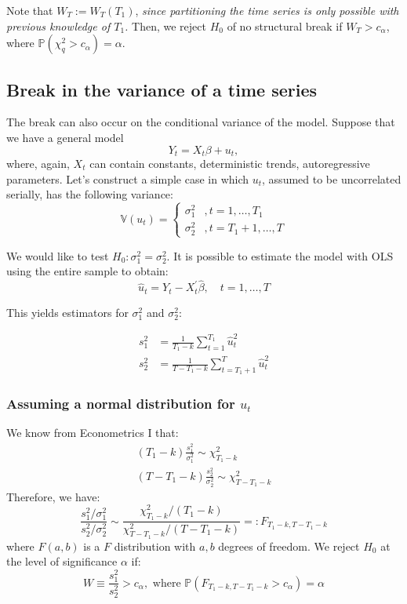 \documentclass[11pt, a4paper]{report}
\theoremstyle{plain}
\theoremstyle{plain}
\theoremstyle{remark}
\begin{document}
Note that $W_T := W_T(T_1)$, \textit{since partitioning the time series is only possible with previous knowledge of $T_1$.} Then, we reject $H_0$ of no structural break if $W_T > c_{\alpha}$, where $\mathbb{P}(\chi^2_q > c_{\alpha}) = \alpha$.

\subsection{Break in the variance of a time series}

The break can also occur on the conditional variance of the model. Suppose that we have a general model
$$ Y_t = X_t \beta + u_t,$$
where, again, $X_t$ can contain constants, deterministic trends, autoregressive parameters. Let's construct a simple case in which $u_t$, assumed to be uncorrelated serially, has the following variance:
$$\mathbb{V}\left(u_{t}\right)=\left\{\begin{array}{ll}
\sigma_{1}^{2} & , t=1, \ldots, T_{1} \\
\sigma_{2}^{2} & , t=T_{1}+1, \ldots, T
\end{array}\right.$$

We would like to test $H_0: \sigma_1^2 = \sigma_2^2$. It is possible to estimate the model with OLS using the entire sample to obtain:
$$
\widehat{u}_{t}=Y_{t}-{X}_{t}^{\prime} \widehat{\beta}, \quad t=1, \ldots, T
$$

This yields estimators for $\sigma_{1}^{2}$ and $\sigma_{2}^{2}$:

$$
\begin{aligned}
s_{1}^{2} &=\frac{1}{T_{1}-k} \sum_{t=1}^{T_{1}} \widehat{u}_{t}^{2} \\
s_{2}^{2} &=\frac{1}{T-T_{1}-k} \sum_{t=T_{1}+1}^{T} \widehat{u}_{t}^{2}
\end{aligned}
$$

\subsubsection{Assuming a normal distribution for $u_t$}

We know from Econometrics I that:
$$
\begin{array}{r}
\left(T_{1}-k\right) \frac{s_{1}^{2}}{\sigma_{1}^{2}} \sim \chi_{T_{1}-k}^{2} \\
\left(T-T_{1}-k\right) \frac{s_{2}^{2}}{\sigma_{2}^{2}} \sim \chi_{T-T_{1}-k}^{2}
\end{array}
$$
Therefore, we have:
$$
\frac{s_{1}^{2} / \sigma_{1}^{2}}{s_{2}^{2} / \sigma_{2}^{2}} \sim \frac{\chi_{T_{1}-k}^{2} /\left(T_{1}-k\right)}{\chi_{T-T_{1}-k}^{2} /\left(T-T_{1}-k\right)}=: F_{T_{1}-k, T-T_{1}-k}
$$
where $F(a, b)$ is a $F$ distribution with $a, b$ degrees of freedom. We reject $H_0$ at the level of significance $\alpha$ if:
$$
W \equiv \frac{s_{1}^{2}}{s_{2}^{2}}>c_{\alpha}, \text { where } \mathbb{P}\left(F_{T_{1}-k, T-T_{1}-k}>c_{\alpha}\right)=\alpha
$$
\end{document}
